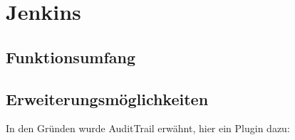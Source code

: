 \pagebreak

\section{Jenkins}
\subsection{Funktionsumfang}
\subsection{Erweiterungsmöglichkeiten}
In den Gründen wurde AuditTrail erwähnt, hier ein Plugin dazu: \cite{jenkins-audit-trail}

